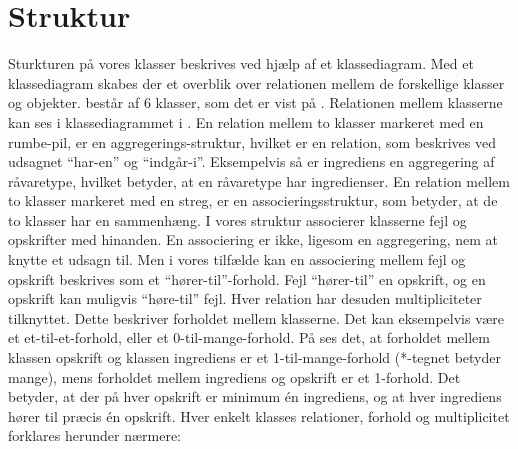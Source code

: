\section{Struktur}
\label{sec:struktur}

Sturkturen på vores klasser beskrives ved hjælp af et klassediagram. Med et klassediagram skabes der et overblik over relationen mellem de forskellige klasser og objekter. \Foodl{} består af 6 klasser, som det er vist på . Relationen mellem klasserne kan ses i klassediagrammet i . En relation mellem to klasser markeret med en rumbe-pil, er en aggregerings-struktur, hvilket er en relation, som beskrives ved udsagnet ``har-en'' og ``indgår-i''. Eksempelvis så er ingrediens en aggregering af råvaretype, hvilket betyder, at en råvaretype har ingredienser. En relation mellem to klasser markeret med en streg, er en associeringsstruktur, som betyder, at de to klasser har en sammenhæng. I vores struktur associerer klasserne fejl og opskrifter med hinanden. En associering er ikke, ligesom en aggregering, nem at knytte et udsagn til. Men i vores tilfælde kan en associering mellem fejl og opskrift beskrives som et ``hører-til''-forhold. Fejl ``hører-til'' en opskrift, og en opskrift kan muligvis ``høre-til'' fejl. Hver relation har desuden multipliciteter tilknyttet. Dette beskriver forholdet mellem klasserne. Det kan eksempelvis være et et-til-et-forhold, eller et 0-til-mange-forhold. På  ses det, at forholdet mellem klassen opskrift og klassen ingrediens er et 1-til-mange-forhold (*-tegnet betyder mange), mens forholdet mellem ingrediens og opskrift er et 1-forhold. Det betyder, at der på hver opskrift er minimum én ingrediens, og at hver ingrediens hører til præcis én opskrift. Hver enkelt klasses relationer, forhold og multiplicitet forklares herunder nærmere:



